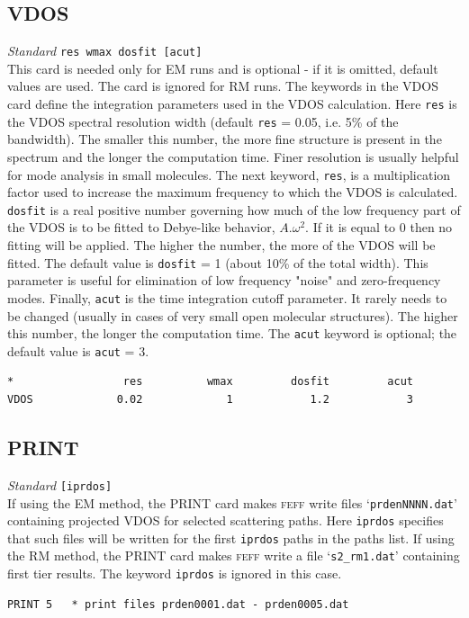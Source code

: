 \documentclass[11pt,oneside]{report} %
\newcommand{\program}[1]{\textsc{#1}}
\newcommand{\feff}{\program{feff}}
\newenvironment{Card}[4]%
      {\vspace{3ex}%
        \subsection{#1}
        \quad\textsl{#3}\newline
        \quad\texttt{#2}\newline%
        \label{card:#4}\\}
      {}
\newcommand{\file}[1]{`\texttt{#1}'}
\begin{document}
\begin{Card}{VDOS}{res wmax dosfit [acut]}{Standard}{spring-vdos}
  This card is needed only for EM runs and is optional - if it is omitted, default values are used.  The card is ignored for RM runs.  The keywords in the VDOS card define the integration parameters used in the
  VDOS calculation.  Here \texttt{res} is the VDOS spectral resolution width (default \texttt{res} = 0.05, i.e. 5\% of the bandwidth).  The smaller this number, the more fine structure is present in the spectrum and the longer the computation time.  Finer resolution is usually helpful for mode analysis in small molecules.  The next keyword, \texttt{res}, is a multiplication factor used to increase the maximum frequency to which the VDOS is calculated.  \texttt{dosfit} is a real positive number governing how much of the low frequency part of the VDOS is to be fitted to Debye-like behavior, $A . \omega^2$.  If it is equal to 0 then no fitting will be applied.  The higher the number, the more of the VDOS will be fitted.  The default value is \texttt{dosfit} = 1 (about 10\% of the total width).  This parameter is useful for elimination of low frequency "noise" and zero-frequency modes.  Finally, \texttt{acut} is the time integration cutoff parameter.  It rarely needs to be changed (usually in cases of very small open molecular structures).  The higher this number, the longer the computation time.  The \texttt{acut} keyword is optional; the default value is \texttt{acut} = 3.
\begin{verbatim}
*                 res          wmax         dosfit         acut
VDOS             0.02             1            1.2            3
\end{verbatim}
\end{Card}


\begin{Card}{PRINT}{[iprdos]}{Standard}{spring-print}
  If using the EM method, the PRINT card makes {\feff} write files \file{prdenNNNN.dat} containing projected VDOS for selected scattering paths.  Here \texttt{iprdos} specifies that such files will be written for the first \texttt{iprdos} paths in the paths list.  If using the RM method, the PRINT card makes {\feff} write a file \file{s2\_rm1.dat} containing first tier results.  The keyword \texttt{iprdos} is ignored in this case.
\begin{verbatim}
PRINT 5   * print files prden0001.dat - prden0005.dat
\end{verbatim}
\end{Card}
\end{document}
